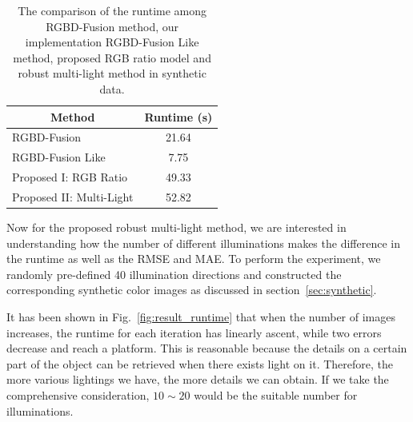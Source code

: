 \begin{table}[!ht]
\caption{The comparison of the runtime among RGBD-Fusion method, our implementation RGBD-Fusion Like method,  proposed RGB ratio model and robust multi-light method in synthetic data.}
\label{tab:runtime}
\centering
\begin{tabular}{|m{4cm} |m{7cm}|}
\hline
\multicolumn{1}{|c|}{Method}                               & \multicolumn{1}{c|}{Runtime (s)}                                                                                                                 \\ \hline
RGBD-Fusion~\cite{or2015rgbd} & \multicolumn{1}{c|}{21.64}             \\ \hline
RGBD-Fusion Like                     & \multicolumn{1}{c|}{7.75}      \\ \hline
Proposed I: RGB Ratio                            & \multicolumn{1}{c|}{49.33}        \\ \hline
Proposed II: Multi-Light                        & \multicolumn{1}{c|}{52.82}\\ \hline
\end{tabular}
\end{table}

Now for the proposed robust multi-light method, we are interested in understanding how the number of different illuminations makes the difference in the runtime as well as the RMSE and MAE.
To perform the experiment, we randomly pre-defined 40 illumination directions and constructed the corresponding synthetic color images as discussed in section~\ref{sec:synthetic}.


It has been shown in Fig.~\ref{fig:result_runtime} that when the number of images increases, the runtime for each iteration has linearly ascent, while two errors decrease and reach a platform. 
This is reasonable because the details on a certain part of the object can be retrieved when there exists light on it. 
Therefore, the more various lightings we have, the more details we can obtain.
If we take the comprehensive consideration, $10\sim20$ would be the suitable number for illuminations.

